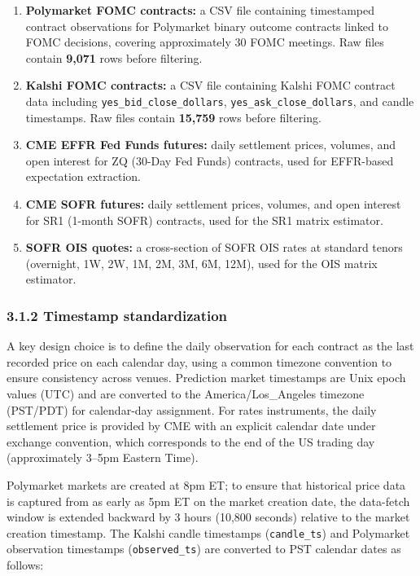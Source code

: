 \begin{enumerate}
    \item \textbf{Polymarket FOMC contracts:} a CSV file containing timestamped contract observations for Polymarket binary outcome contracts linked to FOMC decisions, covering approximately 30 FOMC meetings. Raw files contain \textbf{9,071} rows before filtering.
    \item \textbf{Kalshi FOMC contracts:} a CSV file containing Kalshi FOMC contract data including \texttt{yes\_bid\_close\_dollars}, \texttt{yes\_ask\_close\_dollars}, and candle timestamps. Raw files contain \textbf{15,759} rows before filtering.
    \item \textbf{CME EFFR Fed Funds futures:} daily settlement prices, volumes, and open interest for ZQ (30-Day Fed Funds) contracts, used for EFFR-based expectation extraction.
    \item \textbf{CME SOFR futures:} daily settlement prices, volumes, and open interest for SR1 (1-month SOFR) contracts, used for the SR1 matrix estimator.
    \item \textbf{SOFR OIS quotes:} a cross-section of SOFR OIS rates at standard tenors (overnight, 1W, 2W, 1M, 2M, 3M, 6M, 12M), used for the OIS matrix estimator.
\end{enumerate}

\subsubsection*{3.1.2 Timestamp standardization}

A key design choice is to define the daily observation for each contract as the last recorded price on each calendar day, using a common timezone convention to ensure consistency across venues. Prediction market timestamps are Unix epoch values (UTC) and are converted to the America/Los\_Angeles timezone (PST/PDT) for calendar-day assignment. For rates instruments, the daily settlement price is provided by CME with an explicit calendar date under exchange convention, which corresponds to the end of the US trading day (approximately 3--5pm Eastern Time).

Polymarket markets are created at 8pm ET; to ensure that historical price data is captured from as early as 5pm ET on the market creation date, the data-fetch window is extended backward by 3 hours (10,800 seconds) relative to the market creation timestamp. The Kalshi candle timestamps (\texttt{candle\_ts}) and Polymarket observation timestamps (\texttt{observed\_ts}) are converted to PST calendar dates as follows:

